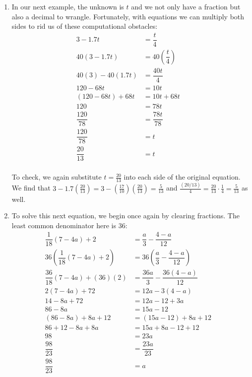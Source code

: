 \begin{ex}
\begin{enumerate}
\item  In our next example, the unknown is $t$ and we not only have a fraction but also a decimal to wrangle.  Fortunately, with equations we can multiply both sides to rid us of  these computational obstacles:
\begin{align*}
3 - 1.7t  & = \dfrac{t}{4} \\
40(3 - 1.7t)  & = 40 \left(\dfrac{t}{4}\right) \tag{Multiply by $40$} \\
40(3) - 40(1.7t)  & = \dfrac{40 t}{4} & \tag{Distribute} \\
120 - 68t & = 10 t \\
(120 -68t) + 68 t & = 10t + 68 t & \tag{Add $68t$ to both sides} \\
120 & = 78 t & \tag{$68t + 10t = (68 + 10)t = 78 t$}\\
\dfrac{120}{78} & = \dfrac{78t}{78} \tag{Divide by the coefficient of $t$}\\
\dfrac{120}{78} & = t \\
\dfrac{20}{13} & = t \tag{Reduce to lowest terms} \\
\end{align*}
											
To check, we again substitute $t = \frac{20}{13}$ into each side of the original equation.  We find that $3 - 1.7 \left(\frac{20}{13}\right) = 3 - \left(\frac{17}{10}\right)\left(\frac{20}{13}\right) =   \frac{5}{13}$ and $\frac{(20/13)}{4} = \frac{20}{13} \cdot \frac{1}{4} = \frac{5}{13}$ as well.

\item  To solve this next equation, we begin once again by clearing fractions.  The least common denominator here is $36$:
\begin{align*}
 \dfrac{1}{18}(7 - 4a) + 2 & = \dfrac{a}{3} - \dfrac{4-a}{12} \\
36 \left(\dfrac{1}{18}(7 - 4a) + 2\right) & = 36 \left(\dfrac{a}{3} - \dfrac{4-a}{12}\right) \tag{Multiply by $36$} \\
\dfrac{36}{18} (7-4a) + (36)(2) & = \dfrac{36a}{3} - \dfrac{36(4-a)}{12} \tag{Distribute} \\
2(7-4a)  + 72 & = 12 a - 3(4-a) \tag{Distribute} \\
14  - 8a + 72 & = 12a - 12 + 3a \\
86 - 8a & = 15 a - 12 \tag{$12 a + 3a = (12+3)a = 15a$} \\
(86-8a)+8a+12 & = (15a-12) + 8a + 12 & \tag{Add $8a$ and $12$} \\
86 + 12 - 8a + 8a & = 15a + 8a - 12 + 12 \tag{Rearrange terms} \\
98 & = 23 a \tag{$15a + 8a = (15+8)a = 23a$} \\
\dfrac{98}{23} & = \dfrac{23a}{23} \tag{Divide by the coefficient of $a$} \\
\dfrac{98}{23} & = a
\end{align*}


\end{enumerate}
\end{ex}
